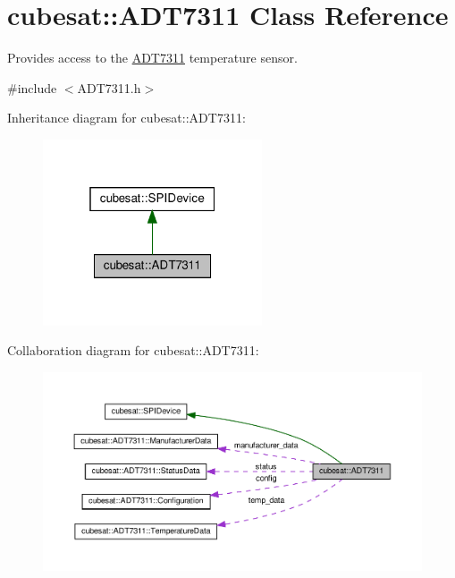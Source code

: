 \hypertarget{classcubesat_1_1ADT7311}{}\section{cubesat\+:\+:A\+D\+T7311 Class Reference}
\label{classcubesat_1_1ADT7311}


Provides access to the \hyperlink{classcubesat_1_1ADT7311}{A\+D\+T7311} temperature sensor.  




{\ttfamily \#include $<$A\+D\+T7311.\+h$>$}



Inheritance diagram for cubesat\+:\+:A\+D\+T7311\+:\nopagebreak
\begin{figure}[H]
\begin{center}
\leavevmode
\includegraphics[width=184pt]{classcubesat_1_1ADT7311__inherit__graph}
\end{center}
\end{figure}


Collaboration diagram for cubesat\+:\+:A\+D\+T7311\+:\nopagebreak
\begin{figure}[H]
\begin{center}
\leavevmode
\includegraphics[width=350pt]{classcubesat_1_1ADT7311__coll__graph}
\end{center}
\end{figure}
